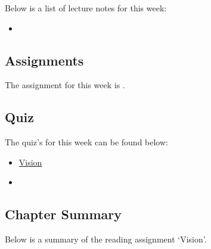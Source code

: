 \noindent Below is a list of lecture notes for this week:

\begin{itemize}
    \item {}
\end{itemize}

\subsection{Assignments}

The assignment for this week is .  

\subsection{Quiz}

The quiz's for this week can be found below:

\begin{itemize}
    \item \href{https://applied.cs.colorado.edu/mod/quiz/view.php?id=49380}{Vision}  
    \item {}
\end{itemize}

\subsection{Chapter Summary}

Below is a summary of the reading assignment `Vision'.

